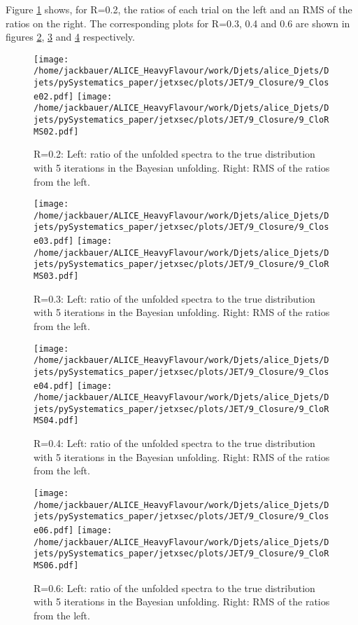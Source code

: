 Figure \ref{fig:unfClosureJet_pp_DzeroR02} shows, for R=0.2, the ratios of each trial on the left and an RMS of the ratios on the right.
The corresponding plots for R=0.3, 0.4 and 0.6 are shown in figures \ref{fig:unfClosureJet_pp_DzeroR03}, \ref{fig:unfClosureJet_pp_DzeroR04} and \ref{fig:unfClosureJet_pp_DzeroR06} respectively.
\begin{figure}[bth]
\centering
\texttt{[image: /home/jackbauer/ALICE\_HeavyFlavour/work/Djets/alice\_Djets/Djets/pySystematics\_paper/jetxsec/plots/JET/9\_Closure/9\_Close02.pdf]}
\texttt{[image: /home/jackbauer/ALICE\_HeavyFlavour/work/Djets/alice\_Djets/Djets/pySystematics\_paper/jetxsec/plots/JET/9\_Closure/9\_CloRMS02.pdf]}
\caption{R=0.2: Left: ratio of the unfolded spectra to the true distribution with 5 iterations in the Bayesian unfolding. Right: RMS of the ratios from the left. 
}
\label{fig:unfClosureJet_pp_DzeroR02}
\end{figure}
\begin{figure}[bth]
\centering
\texttt{[image: /home/jackbauer/ALICE\_HeavyFlavour/work/Djets/alice\_Djets/Djets/pySystematics\_paper/jetxsec/plots/JET/9\_Closure/9\_Close03.pdf]}
\texttt{[image: /home/jackbauer/ALICE\_HeavyFlavour/work/Djets/alice\_Djets/Djets/pySystematics\_paper/jetxsec/plots/JET/9\_Closure/9\_CloRMS03.pdf]}
\caption{R=0.3: Left: ratio of the unfolded spectra to the true distribution with 5 iterations in the Bayesian unfolding. Right: RMS of the ratios from the left. 
}
\label{fig:unfClosureJet_pp_DzeroR03}
\end{figure}
\begin{figure}[bth]
\centering
\texttt{[image: /home/jackbauer/ALICE\_HeavyFlavour/work/Djets/alice\_Djets/Djets/pySystematics\_paper/jetxsec/plots/JET/9\_Closure/9\_Close04.pdf]}
\texttt{[image: /home/jackbauer/ALICE\_HeavyFlavour/work/Djets/alice\_Djets/Djets/pySystematics\_paper/jetxsec/plots/JET/9\_Closure/9\_CloRMS04.pdf]}
\caption{R=0.4: Left: ratio of the unfolded spectra to the true distribution with 5 iterations in the Bayesian unfolding. Right: RMS of the ratios from the left. 
}
\label{fig:unfClosureJet_pp_DzeroR04}
\end{figure}
\begin{figure}[bth]
\centering
\texttt{[image: /home/jackbauer/ALICE\_HeavyFlavour/work/Djets/alice\_Djets/Djets/pySystematics\_paper/jetxsec/plots/JET/9\_Closure/9\_Close06.pdf]}
\texttt{[image: /home/jackbauer/ALICE\_HeavyFlavour/work/Djets/alice\_Djets/Djets/pySystematics\_paper/jetxsec/plots/JET/9\_Closure/9\_CloRMS06.pdf]}
\caption{R=0.6: Left: ratio of the unfolded spectra to the true distribution with 5 iterations in the Bayesian unfolding. Right: RMS of the ratios from the left. 
}
\label{fig:unfClosureJet_pp_DzeroR06}
\end{figure}
